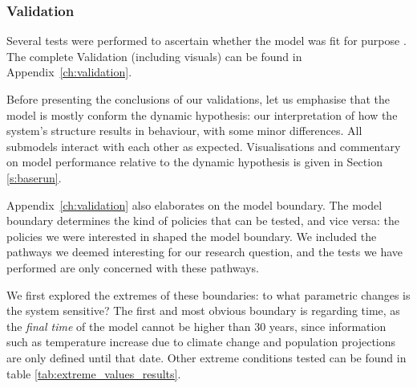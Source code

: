 
\subsubsection{Validation}    


Several tests were performed to ascertain whether the model was fit for purpose \parencite{forrester_tests_1980}. The complete Validation (including visuals) can be found in Appendix~\ref{ch:validation}.

Before presenting the conclusions of our validations, let us emphasise that the model is mostly conform the dynamic hypothesis: our interpretation of how the system's structure results in behaviour, with some minor differences. All submodels interact with each other as expected. Visualisations and commentary on model performance relative to the dynamic hypothesis is given in Section \ref{s:baserun}.
    
Appendix~\ref{ch:validation} also elaborates on the model boundary. The model boundary determines the kind of policies that can be tested, and vice versa: the policies we were interested in shaped the model boundary. We included the pathways we deemed interesting for our research question, and the tests we have performed are only concerned with these pathways.

We first explored the extremes of these boundaries: to what parametric changes is the system sensitive? The first and most obvious boundary is regarding time, as the \textit{final time} of the model cannot be higher than 30 years, since information such as temperature increase due to climate change and population projections are only defined until that date. Other extreme conditions tested can be found in table \ref{tab:extreme_values_results}.

